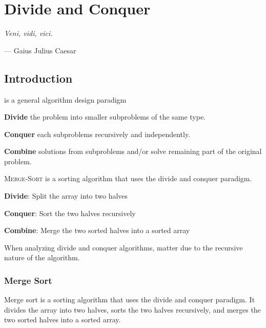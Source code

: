 \chapter{Divide and Conquer}

\textit{Veni, vidi, vici.} 
\begin{flushright}
    --- Gaius Julius Caesar
\end{flushright}

\section{Introduction}

 is a general algorithm design paradigm

\begin{listu}
    \item \textbf{Divide} the problem into smaller subproblems of the same type.
    \item \textbf{Conquer} each subproblems recursively and independently.
    \item \textbf{Combine} solutions from subproblems and/or solve remaining part of the original problem.
\end{listu}

\begin{example}
    \textsc{Merge-Sort} is a sorting algorithm that uses the divide and conquer paradigm.

    \begin{listu}
        \item \textbf{Divide}: Split the array into two halves
        \item \textbf{Conquer}: Sort the two halves recursively
        \item \textbf{Combine}: Merge the two sorted halves into a sorted array
    \end{listu}
\end{example}

\begin{remark}
    When analyzing divide and conquer algorithms,  matter due to the recursive nature of the algorithm.
\end{remark}

\subsection{Merge Sort}

Merge sort is a sorting algorithm that uses the divide and conquer paradigm. It divides the array into two halves, sorts the two halves recursively, and merges the two sorted halves into a sorted array.

